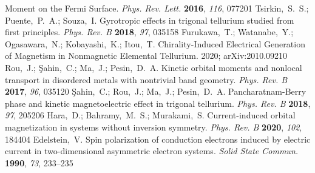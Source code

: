 \documentclass[journal=nalefd,manuscript=article,layout=twocolumn]{achemso}
\begin{document}
\begin{mcitethebibliography}{48}
  Moment on the Fermi Surface. \emph{Phys. Rev. Lett.} \textbf{2016},
  \emph{116}, 077201\relax
\mciteBstWouldAddEndPuncttrue
\mciteSetBstMidEndSepPunct{\mcitedefaultmidpunct}
{\mcitedefaultendpunct}{\mcitedefaultseppunct}\relax
\EndOfBibitem
{}
Tsirkin,~S.~S.; Puente,~P.~A.; Souza,~I. Gyrotropic effects in trigonal
  tellurium studied from first principles. \emph{Phys. Rev. B} \textbf{2018},
  \emph{97}, 035158\relax
\mciteBstWouldAddEndPuncttrue
\mciteSetBstMidEndSepPunct{\mcitedefaultmidpunct}
{\mcitedefaultendpunct}{\mcitedefaultseppunct}\relax
\EndOfBibitem
{}
Furukawa,~T.; Watanabe,~Y.; Ogasawara,~N.; Kobayashi,~K.; Itou,~T.
  Chirality-Induced Electrical Generation of Magnetism in Nonmagnetic Elemental
  Tellurium. 2020; arXiv:2010.09210\relax
\mciteBstWouldAddEndPuncttrue
\mciteSetBstMidEndSepPunct{\mcitedefaultmidpunct}
{\mcitedefaultendpunct}{\mcitedefaultseppunct}\relax
\EndOfBibitem
{}
Rou,~J.; {\c{S}}ahin,~C.; Ma,~J.; Pesin,~D.~A. Kinetic orbital moments and
  nonlocal transport in disordered metals with nontrivial band geometry.
  \emph{Phys. Rev. B} \textbf{2017}, \emph{96}, 035120\relax
\mciteBstWouldAddEndPuncttrue
\mciteSetBstMidEndSepPunct{\mcitedefaultmidpunct}
{\mcitedefaultendpunct}{\mcitedefaultseppunct}\relax
\EndOfBibitem
{}
{\c{S}}ahin,~C.; Rou,~J.; Ma,~J.; Pesin,~D.~A. Pancharatnam-Berry phase and
  kinetic magnetoelectric effect in trigonal tellurium. \emph{Phys. Rev. B}
  \textbf{2018}, \emph{97}, 205206\relax
\mciteBstWouldAddEndPuncttrue
\mciteSetBstMidEndSepPunct{\mcitedefaultmidpunct}
{\mcitedefaultendpunct}{\mcitedefaultseppunct}\relax
\EndOfBibitem
{}
Hara,~D.; Bahramy,~M.~S.; Murakami,~S. Current-induced orbital magnetization in
  systems without inversion symmetry. \emph{Phys. Rev. B} \textbf{2020},
  \emph{102}, 184404\relax
\mciteBstWouldAddEndPuncttrue
\mciteSetBstMidEndSepPunct{\mcitedefaultmidpunct}
{\mcitedefaultendpunct}{\mcitedefaultseppunct}\relax
\EndOfBibitem
{}
Edelstein,~V. Spin polarization of conduction electrons induced by electric
  current in two-dimensional asymmetric electron systems. \emph{Solid State
  Commun.} \textbf{1990}, \emph{73}, 233--235\relax
\mciteBstWouldAddEndPuncttrue

\end{mcitethebibliography}
\end{document}
